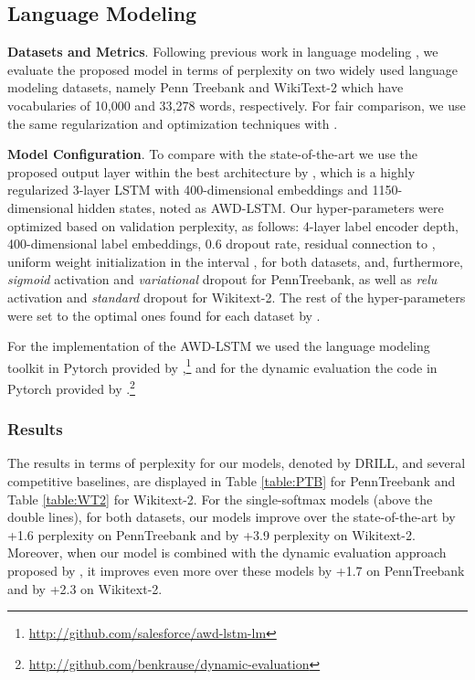 \documentclass{article}
\begin{document}
\subsection{Language Modeling}
\label{sec:lm}

\textbf{Datasets and Metrics}. Following previous work in language modeling  \cite{mos2018,krause2017dynamic,merity2017regularizing,melis2017state}, we evaluate the proposed model in terms of  perplexity on two widely used language modeling datasets, namely Penn Treebank \cite{mikolov2010} and WikiText-2  \cite{merity2017regularizing} which have vocabularies of 10,000 and 33,278 words, respectively.  For fair comparison, we use the same regularization and optimization techniques with  \citet{merity2017regularizing}. 

\textbf{Model Configuration}.
To compare with the state-of-the-art we use the proposed output layer within the best architecture by \citet{merity2017regularizing}, which is a highly regularized 3-layer LSTM with 400-dimensional embeddings and 1150-dimensional hidden states, noted as AWD-LSTM. Our hyper-parameters were optimized based on validation perplexity, as follows:  4-layer label encoder depth, 400-dimensional label embeddings,  0.6 dropout rate,  residual connection to , uniform weight initialization in the interval , for both datasets, and, furthermore, \textit{sigmoid} activation and \textit{variational} dropout for PennTreebank, as well as \textit{relu} activation and \textit{standard} dropout for Wikitext-2. The rest of the hyper-parameters were set to the optimal ones found for each dataset by \citet{merity2017regularizing}. 

For the implementation of the AWD-LSTM we used the language modeling toolkit in  Pytorch provided by \citet{merity2017regularizing},\footnote{\url{http://github.com/salesforce/awd-lstm-lm}} and for the dynamic evaluation the code in Pytorch provided by \citet{krause2017dynamic}.\footnote{\url{http://github.com/benkrause/dynamic-evaluation}} 

\subsubsection{Results}
\label{lm_results}

The results in terms of perplexity for our models, denoted by DRILL, and several competitive baselines, are displayed in Table \ref{table:PTB} for PennTreebank and Table \ref{table:WT2} for Wikitext-2.
For the single-softmax models (above the double lines), for both datasets, our models improve over the state-of-the-art by +1.6 perplexity on PennTreebank and by +3.9 perplexity on Wikitext-2. Moreover, when our model is combined with the dynamic evaluation approach proposed by \citet{krause2017dynamic}, it improves even more over these models by +1.7 on PennTreebank and by +2.3 on Wikitext-2.
\end{document}
